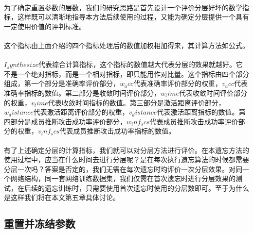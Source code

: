 \paragraph{}为了确定重置参数的层数，我们的研究思路是首先设计一个评价分层好坏的数学指标，这样既可以清晰地指导本方法后续使用的过程，又能为确定分层提供一个具有一定使用价值的评判标准。
\paragraph{}这个指标由上面介绍的四个指标处理后的数值加权相加得来，其计算方法如公式。
\paragraph{}$I_synthesize$代表综合计算指标，这个指标的数值越大代表分层的效果就越好。它不是一个绝对指标，而是一个相对指标，即只能用作对比量。这个指标由四个部分组成，第一个部分是准确率评价部分，$w_acc$代表准确率评价部分的权重，$v_acc$代表准确率指标的数值。第二部分是收敛时间评价部分，$w_time$代表收敛时间评价部分的权重，$v_time$代表收敛时间指标的数值。第三部分是激活距离评价部分，$w_distance$代表激活距离评价部分的权重，$v_distance$代表激活距离指标的数值。第四部分是成员推断攻击成功率评价部分，$w_inf_scs$代表成员推断攻击成功率评价部分的权重，$v_inf_scs$代表成员推断攻击成功率指标的数值。
\paragraph{}有了上述确定分层的计算指标，我们就可以对分层方法进行评价。在本遗忘方法的使用过程中，应当在什么时间去进行分层呢？是在每次执行遗忘算法的时候都需要分层一次吗？答案是否定的，我们无需在每次遗忘时均评价一次分层效果。对同一个网络结构，同一套网络训练数据集，我们仅需在首次遗忘时进行分层效果的测试，在后续的遗忘训练时，只需要使用首次遗忘时使用的分层数即可。至于为什么是这样我们将在本文第五章具体讨论。

\subsection{重置并冻结参数}
